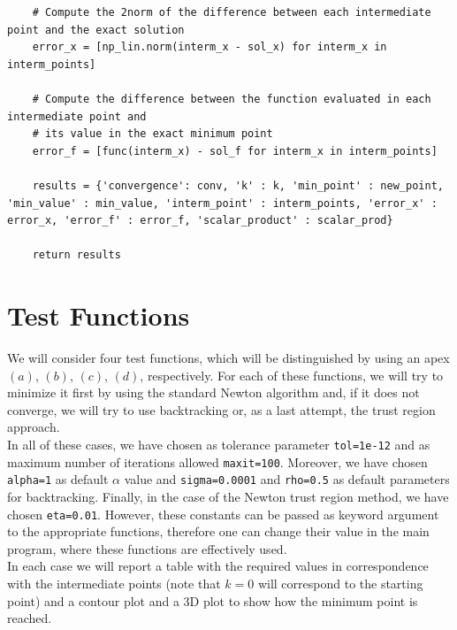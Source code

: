 \documentclass[a4paper,11pt]{article}
\begin{document}
\begin{verbatim}
    # Compute the 2norm of the difference between each intermediate point and the exact solution
    error_x = [np_lin.norm(interm_x - sol_x) for interm_x in interm_points]

    # Compute the difference between the function evaluated in each intermediate point and 
    # its value in the exact minimum point
    error_f = [func(interm_x) - sol_f for interm_x in interm_points]

    results = {'convergence': conv, 'k' : k, 'min_point' : new_point, 'min_value' : min_value, 'interm_point' : interm_points, 'error_x' : error_x, 'error_f' : error_f, 'scalar_product' : scalar_prod}

    return results
\end{verbatim}


	\section{Test Functions}
	We will consider four test functions, which will be distinguished by using an apex $(a)$, $(b)$, $(c)$, $(d)$, respectively. For each of these functions, we will try to minimize it first by using the standard Newton algorithm and, if it does not converge, we will try to use backtracking or, as a last attempt, the trust region approach.\\
	
	\noindent In all of these cases, we have chosen as tolerance parameter  \texttt{tol=1e-12} and as maximum number of iterations allowed \texttt{maxit=100}. Moreover, we have chosen \texttt{alpha=1} as default $\alpha$ value and \texttt{sigma=0.0001} and \texttt{rho=0.5} as default parameters for backtracking. Finally, in the case of the Newton trust region method, we have chosen \texttt{eta=0.01}. However, these constants can be passed as keyword argument to the appropriate functions, therefore one can change their value in the main program, where these functions are effectively used.\\
	
	\noindent In each case we will report a table with the required values in correspondence with the intermediate points (note that $k=0$ will correspond to the starting point) and a contour plot and a 3D plot to show how the minimum point is reached.
	
	
\end{document}
